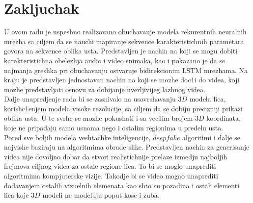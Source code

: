 \documentclass[a4paper, openany, oneside, 11pt]{book}
\begin{document}
\chapter{Zakljuchak} 
U ovom radu je uspeshno realizovano obuchavanje modela rekurentnih neuralnih mrezha sa ciljem da se nauchi mapiranje sekvence karakteristichnih parametara govora na sekvence oblika usta. Predstavljen je nachin na koji se mogu dobiti karakteristichna obelezhja audio i video snimaka, kao i pokazano je da se najmanja greshka pri obuchavanju ostvaruje bidirekcionim \acrshort{LSTM} mrezhama. Na kraju je predstavljen jednostavan nachin na koji se mozhe doc1i do videa, koji mozhe predstavljati osnovu za dobijanje uverljivijeg lazhnog videa.\\
Dalje unapredjenje rada bi se zasnivalo na usavrshavanju $3D$ modela lica, korish\-c1enjem modela visoke rezolucije, sa ciljem da se dobiju precizniji prikazi oblika usta. U te svrhe se mozhe pokushati i sa vec1im brojem $3D$ koordinata, koje ne pripadaju samo usnama nego i ostalim regionima u predelu usta.\\
Pored sve boljih modela veshtachke inteligencije, $deepfake$ algoritimi i dalje se najvishe baziraju na algoritmima obrade slike. Predstavljen nachin za generisanje videa nije dovoljno dobar da stvori realistichnije prelaze izmedju najboljih frejmova ciljnog videa za ostale regione lica. To bi se moglo unaprediti algoritmima kompjuterske vizije. Takodje bi se video mogao unaprediti dodavanjem ostalih vizuelnih elemenata kao shto su pozadina i ostali elementi lica koje $3D$ modeli ne modeluju poput kose i zuba. 
\end{document}
